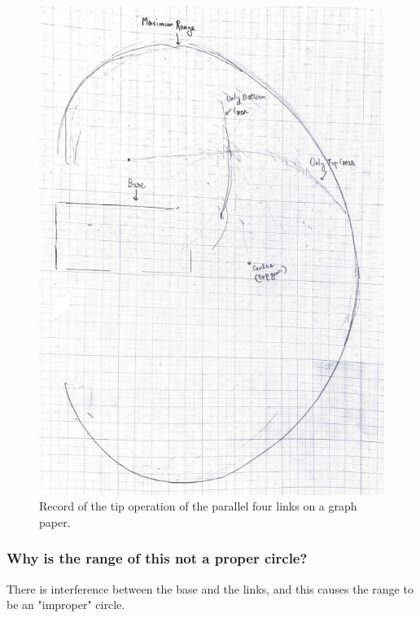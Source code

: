 \documentclass[12pt,a4paper]{report}
\begin{document}
\begin{figure}[htbp]
            \centering
    \includegraphics[width=\textwidth]{figures/ass11}
    \caption{Record of the tip operation of the parallel four links on a graph paper.}
    \label{fig:ass11}
\end{figure}
\subsubsection{Why is the range of this not a proper circle?}
There is interference between the base and the links, and this causes the range to be an "improper" circle. 
\end{document}
